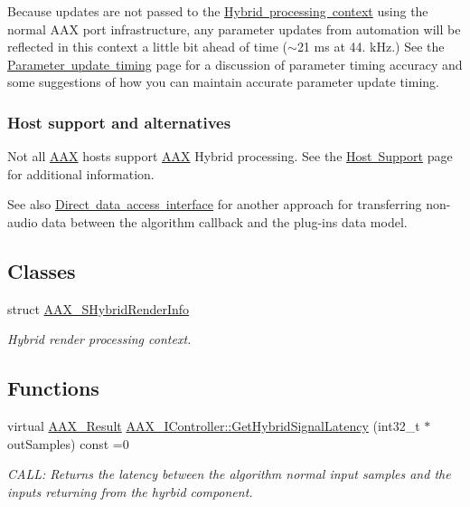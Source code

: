 Because updates are not passed to the \mbox{\hyperlink{a01673}{Hybrid processing context}} using the normal A\+AX port infrastructure, any parameter updates from automation will be reflected in this context a little bit ahead of time ($\sim$21 ms at 44. k\+Hz.) See the \mbox{\hyperlink{a00821}{Parameter update timing}} page for a discussion of parameter timing accuracy and some suggestions of how you can maintain accurate parameter update timing.\hypertarget{a00805_additionalFeatures_Hybrid_hostsupport}{}\subsubsection{Host support and alternatives}\label{a00805_additionalFeatures_Hybrid_hostsupport}
Not all \mbox{\hyperlink{a00852}{A\+AX}} hosts support \mbox{\hyperlink{a00852}{A\+AX}} Hybrid processing. See the \mbox{\hyperlink{a00845}{Host Support}} page for additional information.

\begin{DoxySeeAlso}{See also}
\mbox{\hyperlink{a00803}{Direct data access interface}} for another approach for transferring non-\/audio data between the algorithm callback and the plug-\/in\textquotesingle{}s data model. 
\end{DoxySeeAlso}
\subsection*{Classes}
\begin{DoxyCompactItemize}
\item 
struct \mbox{\hyperlink{a01673}{A\+A\+X\+\_\+\+S\+Hybrid\+Render\+Info}}
\begin{DoxyCompactList}\small\item\em Hybrid render processing context. \end{DoxyCompactList}\end{DoxyCompactItemize}
\subsection*{Functions}
\begin{DoxyCompactItemize}
\item 
virtual \mbox{\hyperlink{a00392_a4d8f69a697df7f70c3a8e9b8ee130d2f}{A\+A\+X\+\_\+\+Result}} \mbox{\hyperlink{a00805_ga47b471c438fcad0798964b860d74609e}{A\+A\+X\+\_\+\+I\+Controller\+::\+Get\+Hybrid\+Signal\+Latency}} (int32\+\_\+t $\ast$out\+Samples) const =0
\begin{DoxyCompactList}\small\item\em C\+A\+LL\+: Returns the latency between the algorithm normal input samples and the inputs returning from the hyrbid component. \end{DoxyCompactList}\end{DoxyCompactItemize}
